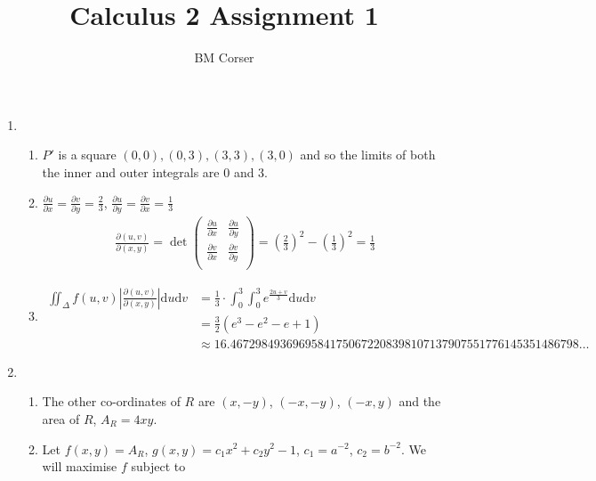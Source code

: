 \documentclass[10pt]{article}
\author{BM Corser}
\title{Calculus 2 Assignment 1}
\date{}
\begin{document}
    \maketitle 
    \begin{enumerate}
            \item 
    \begin{enumerate}
        \item $P'$ is a square $(0,0), (0,3), (3,3), (3, 0)$ and so the limits
            of both the inner and outer integrals are 0 and 3.
        \item $\frac{\partial u}{\partial x} = \frac{\partial v}{\partial y} = \frac{2}{3}$, 
              $\frac{\partial u}{\partial y} = \frac{\partial v}{\partial x} = \frac{1}{3}$
            \begin{align*}
                \frac{\partial(u,v)}{\partial(x,y)}
                = \det \left(
                \begin{array}{cc}
                    \tfrac{\partial u}{\partial x} & \tfrac{\partial u}{\partial y} \\
                    \tfrac{\partial v}{\partial x} & \tfrac{\partial v}{\partial y} \\
                \end{array}
                \right)
                = \left(\frac{2}{3}\right)^2 - \left(\frac{1}{3}\right)^2 = \frac{1}{3}
            \end{align*}
        \item
            \begin{align*}
                \iint_\Delta f(u,v) \left|\frac{\partial(u,v)}{\partial(x,y)}\right| \text{d}u\text{d}v
                &= \frac{1}{3} \cdot \int_0^3\int_0^3 e^{\frac{2u+v}{3}} \text{d}u\text{d}v \\
                &= \tfrac{3}{2}(e^3 - e^2 - e +1) \\
                &\approx 16.46729849369695841750672208398107137907551776145351486798\dots
            \end{align*}
        \end{enumerate}
        \item
            \begin{enumerate}
                \item The other co-ordinates of $R$ are $(x, -y)$, $(-x, -y)$, $(-x, y)$ and the area of $R$, $A_R = 4xy$.
                \item Let $f(x,y) = A_R$, $g(x,y) = c_1x^2 + c_2y^2 - 1$, $c_1
                    = a^{-2}$, $c_2 = b^{-2}$. We will maximise $f$ subject to

\end{enumerate}
\end{enumerate}
\end{document}
